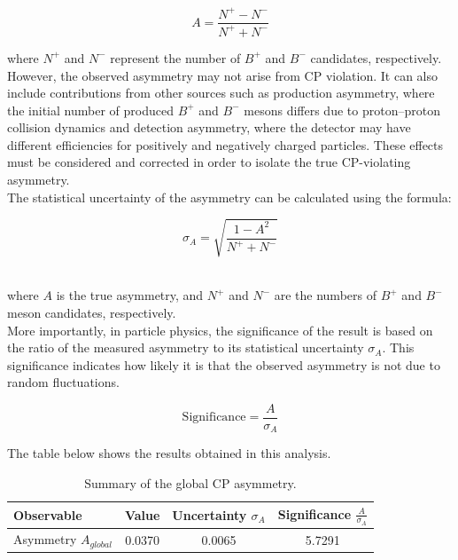     \begin{equation}
    A = \frac{N^+ - N^-}{N^+ + N^-}
    \label{asym}
    \end{equation}

    where \(N^+\) and \(N^-\) represent the number of \(B^+\) and \(B^-\) candidates, respectively.
    \\
    
    However, the observed asymmetry may not arise from CP violation. It can also include contributions from other sources such as production asymmetry, where the initial number of produced \(B^+\) and \(B^-\) mesons differs due to proton–proton collision dynamics and detection asymmetry, where the detector may have different efficiencies for positively and negatively charged particles. These effects must be  considered and corrected in order to isolate the true CP-violating asymmetry.
    \\
    
    The statistical uncertainty of the asymmetry can be calculated using the formula:

    \begin{equation}
    \sigma_A = \sqrt{\frac{1 - A^2}{N^+ + N^-}}
    \label{sigma}
    \end{equation}

    \\ 
    
    where \(A\) is the true asymmetry, and \(N^+\) and \(N^-\) are the numbers of \(B^+\) and \(B^-\) meson candidates, respectively.
    \\  
    
    More importantly, in particle physics, the significance of the result is based on the ratio of the measured asymmetry to its statistical uncertainty \(\sigma_A\). This significance indicates how likely it is that the observed asymmetry is not due to random fluctuations.

    \begin{equation}
    \text{Significance} = \frac{A}{\sigma_A}
    \label{sig}
    \end{equation}

    The table below shows the results obtained in this analysis.

    \begin{table}[H]
    \centering
    \begin{tabular}{lccc}
        \hline
        \textbf{Observable} & \textbf{Value} & \textbf{Uncertainty \(\sigma_A\)} & \textbf{Significance \(\frac{A}{\sigma_A}\)} \\
        \hline
        Asymmetry \(A_{global}\) & 0.0370 & 0.0065 & 5.7291 \\
        \hline
    \end{tabular}
    \caption{Summary of the global CP asymmetry.}
    \label{asymmetry-results}
    \end{table}
    
